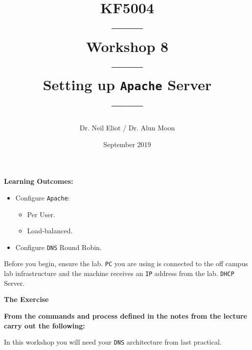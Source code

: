 \documentclass[11pt]{article}
\begin{document}
\author{Dr. Neil Eliot / Dr. Alun Moon}
\title{KF5004\\------\\Workshop 8\\------\\Setting up \texttt{Apache} Server\\------}
\date{September 2019}
\maketitle

\newpage



\noindent\textbf{Learning Outcomes:}
\begin{itemize}
    \item Configure \texttt{Apache}:
        \begin{itemize}
            \item Per User.
            \item Load-balanced.
        \end{itemize}
    \item Configure \texttt{DNS} Round Robin.
\end{itemize}


\begin{tcolorbox}[title={\textbf{Important:}}]
    Before you begin, ensure the lab. \texttt{PC} you are using is connected to the off campus lab infrastructure and the machine receives an \texttt{IP} address from the lab. \texttt{DHCP} Server.
\end{tcolorbox}
\newpage

\noindent\textbf{The Exercise}\\
\begin{tcolorbox}[colback=blue!20]
    \noindent\textbf{From the commands and process defined in the notes from the lecture carry out the following:}
\end{tcolorbox}


\begin{tcolorbox}[title={\textbf{NOTE:}}]
    In this workshop you will need your \texttt{DNS} architecture from last practical.
\end{tcolorbox}
\end{document}
